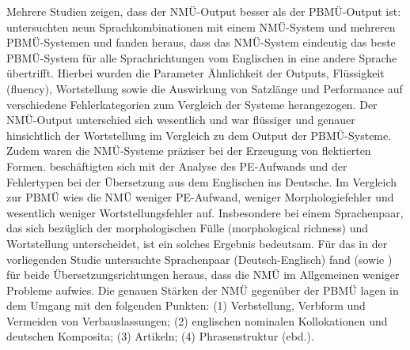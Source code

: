 Mehrere Studien zeigen, dass der NMÜ-Output besser als der PBMÜ-Output ist: \citet{ToralSanchez-Cartagena2017} untersuchten neun Sprachkombinationen mit einem NMÜ-System und mehreren PBMÜ-Systemen und fanden heraus, dass das NMÜ-System eindeutig das beste PBMÜ-System für alle Sprachrichtungen vom Englischen in eine andere Sprache übertrifft. Hierbei wurden die Parameter Ähnlichkeit der Outputs, Flüssigkeit (fluency), Wortstellung sowie die Auswirkung von Satzlänge und Performance auf verschiedene Fehlerkategorien zum Vergleich der Systeme herangezogen. Der NMÜ-Output unterschied sich wesentlich und war flüssiger und genauer hinsichtlich der Wortstellung im Vergleich zu dem Output der PBMÜ-Systeme. Zudem waren die NMÜ-Systeme präziser bei der Erzeugung von flektierten Formen. \citet{BentivogliEtAl2016} beschäftigten sich mit der Analyse des PE-Aufwands und der Fehlertypen bei der Übersetzung aus dem Englischen ins Deutsche. Im Vergleich zur PBMÜ wies die NMÜ weniger PE-Aufwand, weniger Morphologiefehler und wesentlich weniger Wortstellungsfehler auf. Insbesondere bei einem Sprachenpaar, das sich bezüglich der morphologischen Fülle (morphological richness) und Wortstellung unterscheidet, ist ein solches Ergebnis bedeutsam. Für das in der vorliegenden Studie untersuchte Sprachenpaar (Deutsch-Englisch) fand \citet{Popović2017} (sowie \citealt{Popović2018}) für beide Übersetzungsrichtungen heraus, dass die NMÜ im Allgemeinen weniger Probleme aufwies. Die genauen Stärken der NMÜ gegenüber der PBMÜ lagen in dem Umgang mit den folgenden Punkten: (1) Verbstellung, Verbform und Vermeiden von Verbauslassungen; (2) englischen nominalen Kollokationen und deutschen Komposita; (3) Artikeln; (4) Phrasenstruktur (ebd.).

